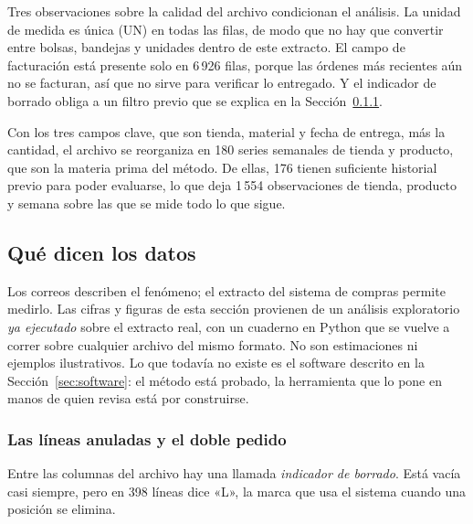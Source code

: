 Tres observaciones sobre la calidad del archivo condicionan el análisis. La unidad de medida es única (UN) en todas las filas, de modo que no hay que convertir entre bolsas, bandejas y unidades dentro de este extracto. El campo de facturación está presente solo en 6\,926 filas, porque las órdenes más recientes aún no se facturan, así que no sirve para verificar lo entregado. Y el indicador de borrado obliga a un filtro previo que se explica en la Sección~\ref{sec:anuladas}.

Con los tres campos clave, que son tienda, material y fecha de entrega, más la cantidad, el archivo se reorganiza en 180 series semanales de tienda y producto, que son la materia prima del método. De ellas, 176 tienen suficiente historial previo para poder evaluarse, lo que deja 1\,554 observaciones de tienda, producto y semana sobre las que se mide todo lo que sigue.

\subsection{Qué dicen los datos}
\label{sec:datos}

Los correos describen el fenómeno; el extracto del sistema de compras permite medirlo.  Las cifras y figuras de esta sección provienen de un análisis exploratorio \emph{ya ejecutado} sobre el extracto real, con un cuaderno en Python que se vuelve a correr sobre cualquier archivo del mismo formato. No son estimaciones ni ejemplos ilustrativos. Lo que todavía no existe es el software descrito en la Sección~\ref{sec:software}: el método está probado, la herramienta que lo pone en manos de quien revisa está por construirse. 

\subsubsection{Las líneas anuladas y el doble pedido}
\label{sec:anuladas}

Entre las columnas del archivo hay una llamada \emph{indicador de borrado}. Está vacía casi siempre, pero en 398 líneas dice «L», la marca que usa el sistema cuando una posición se elimina. 


